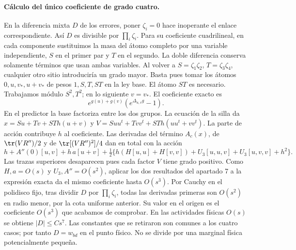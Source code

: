 \paragraph{Cálculo del único coeficiente de grado cuatro.}
En la diferencia mixta $D$ de los errores, poner $\zeta_i=0$ hace inoperante el
enlace correspondiente. Así $D$ es divisible por $\prod_i\zeta_i$. Para su coeficiente
cuadrilineal, en cada componente sustituimos la masa del átomo completo por una variable
independiente, $S$ en el primer par y $T$ en el segundo. La doble diferencia conserva
solamente términos que usan ambas variables. Al volver a $S=\zeta_1\zeta_2$,
$T=\zeta_3\zeta_4$, cualquier otro sitio introduciría un grado mayor.
Basta pues tomar los átomos $0,u,v_*,u+v_*$ de pesos $1,S,T,ST$ en la ley base.
El átomo $ST$ es necesario. Trabajamos módulo $S^2,T^2$; en lo siguiente $v=v_*$.
El coeficiente exacto es
\[
 e^{g(u)+g(v)}(e^{\Delta_{u,v}g}-1).
\]
En el predictor la base factoriza entre los dos grupos. La ecuación de la silla da
$x=Su+Tv+STh(u+v)$ y $V=Suu^t+Tvv^t+STh(uu^t+vv^t)$.
La parte de acción contribuye $h$ al coeficiente. Las derivadas del término $A_c(x)$,
de $\tr(VR'')/2$ y de $\tr[(VR'')^2]/4$ dan en total con la acción
\[
 h+A''(0)[u,v]+h\,a[u+v]
 +\tfrac12\{h(H[u,u]+H[v,v])+U_3[u,u,v]+U_3[u,v,v]+h^2\}.
\]
Las trazas superiores desaparecen pues cada factor $V$ tiene grado positivo.
Como $H,a=O(s)$ y $U_3,A''=O(s^2)$, aplicar los dos resultados del apartado 7
a la expresión exacta da el mismo coeficiente hasta $O(s^3)$.
Por Cauchy en el polidisco fijo, tras dividir $D$ por $\prod_i\zeta_i$, todas las
derivadas primeras son $O(s^2)$ en radio menor, por la cota uniforme anterior.
Su valor en el origen es el coeficiente $O(s^3)$ que acabamos de comprobar.
En las actividades físicas $O(s)$ se obtiene $|D|\le C s^7$.
Las constantes que se retiraron son comunes a los cuatro casos; por tanto $D=w_{bd}$
en el punto físico. No se divide por una marginal física potencialmente pequeña.
